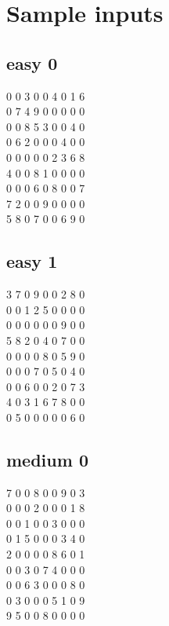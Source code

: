 \documentclass[11pt]{report}
\begin{document}
    \section{Sample inputs}
        \subsection{easy 0} \label{sec:easy0}
            0 0 3 0 0 4 0 1 6\\ 
            0 7 4 9 0 0 0 0 0\\
            0 0 8 5 3 0 0 4 0\\
            0 6 2 0 0 0 4 0 0\\
            0 0 0 0 0 2 3 6 8\\
            4 0 0 8 1 0 0 0 0\\
            0 0 0 6 0 8 0 0 7\\
            7 2 0 0 9 0 0 0 0\\
            5 8 0 7 0 0 6 9 0\\

        
        \subsection{easy 1} \label{sec:easy1}
            3 7 0 9 0 0 2 8 0\\
            0 0 1 2 5 0 0 0 0\\
            0 0 0 0 0 0 9 0 0\\
            5 8 2 0 4 0 7 0 0\\
            0 0 0 0 8 0 5 9 0\\
            0 0 0 7 0 5 0 4 0\\
            0 0 6 0 0 2 0 7 3\\
            4 0 3 1 6 7 8 0 0\\
            0 5 0 0 0 0 0 6 0\\

        \subsection{medium 0} \label{sec:mid0}
            7 0 0 8 0 0 9 0 3\\
            0 0 0 2 0 0 0 1 8\\
            0 0 1 0 0 3 0 0 0\\
            0 1 5 0 0 0 3 4 0\\
            2 0 0 0 0 8 6 0 1\\
            0 0 3 0 7 4 0 0 0\\
            0 0 6 3 0 0 0 8 0\\
            0 3 0 0 0 5 1 0 9\\
            9 5 0 0 8 0 0 0 0\\    
\end{document}
